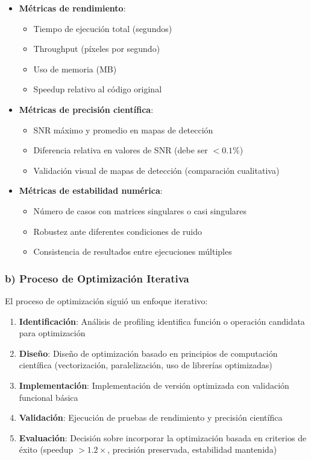 \begin{itemize}
    \item \textbf{Métricas de rendimiento}:
    \begin{itemize}
        \item Tiempo de ejecución total (segundos)
        \item Throughput (píxeles por segundo)
        \item Uso de memoria (MB)
        \item Speedup relativo al código original
    \end{itemize}
    
    \item \textbf{Métricas de precisión científica}:
    \begin{itemize}
        \item SNR máximo y promedio en mapas de detección
        \item Diferencia relativa en valores de SNR (debe ser $< 0.1\%$)
        \item Validación visual de mapas de detección (comparación cualitativa)
    \end{itemize}
    
    \item \textbf{Métricas de estabilidad numérica}:
    \begin{itemize}
        \item Número de casos con matrices singulares o casi singulares
        \item Robustez ante diferentes condiciones de ruido
        \item Consistencia de resultados entre ejecuciones múltiples
    \end{itemize}
\end{itemize}

\subsubsection{b) Proceso de Optimización Iterativa}

El proceso de optimización siguió un enfoque iterativo:

\begin{enumerate}
    \item \textbf{Identificación}: Análisis de profiling identifica función o operación candidata para optimización
    \item \textbf{Diseño}: Diseño de optimización basado en principios de computación científica (vectorización, paralelización, uso de librerías optimizadas)
    \item \textbf{Implementación}: Implementación de versión optimizada con validación funcional básica
    \item \textbf{Validación}: Ejecución de pruebas de rendimiento y precisión científica
    \item \textbf{Evaluación}: Decisión sobre incorporar la optimización basada en criterios de éxito (speedup $> 1.2\times$, precisión preservada, estabilidad mantenida)
\end{enumerate}

